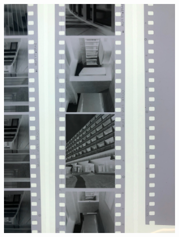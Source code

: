 \begin{figure}[H]
\begin{subfigure}{0.20\textwidth}
        \caption{}
    \end{subfigure}
    \begin{subfigure}{0.24\textwidth}
        \includegraphics[width=\linewidth]{Illustrations/P6.jpg}
        \caption{}
    \end{subfigure}
    \begin{subfigure}{0.24\textwidth}

\end{subfigure}
\end{figure}
